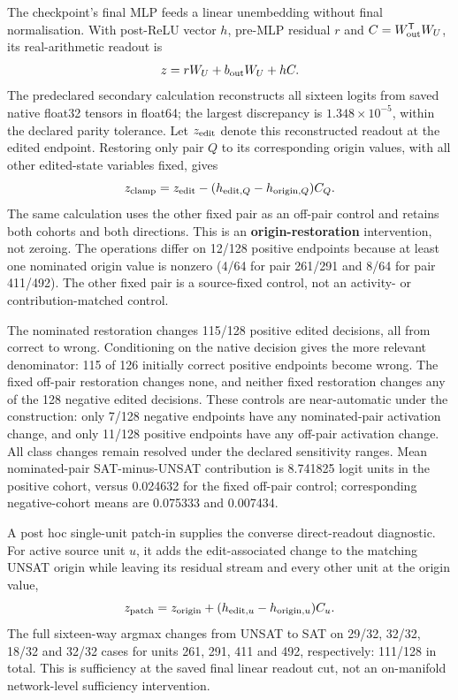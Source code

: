 \documentclass[
  british,
  11pt,
  a4paper,
]{article}
\newcounter{none} %
\begin{document}
The checkpoint's final MLP feeds a linear unembedding without final
normalisation. With post-ReLU vector \(h\), pre-MLP residual \(r\) and
\(C=W_{\rm out}^{\mathsf T}W_U\), its real-arithmetic readout is \[
 z=rW_U+b_{\rm out}W_U+hC.
\] The predeclared secondary calculation reconstructs all sixteen logits
from saved native float32 tensors in float64; the largest discrepancy is
\(1.348\times10^{-5}\), within the declared parity tolerance. Let
\(z_{\rm edit}\) denote this reconstructed readout at the edited
endpoint. Restoring only pair \(Q\) to its corresponding origin values,
with all other edited-state variables fixed, gives \[
 z_{\rm clamp}=z_{\rm edit}-(h_{{\rm edit},Q}-h_{{\rm origin},Q})C_Q.
\] The same calculation uses the other fixed pair as an off-pair control
and retains both cohorts and both directions. This is an
\textbf{origin-restoration} intervention, not zeroing. The operations
differ on 12/128 positive endpoints because at least one nominated
origin value is nonzero (4/64 for pair 261/291 and 8/64 for pair
411/492). The other fixed pair is a source-fixed control, not an
activity- or contribution-matched control.

The nominated restoration changes 115/128 positive edited decisions, all
from correct to wrong. Conditioning on the native decision gives the
more relevant denominator: 115 of 126 initially correct positive
endpoints become wrong. The fixed off-pair restoration changes none, and
neither fixed restoration changes any of the 128 negative edited
decisions. These controls are near-automatic under the construction:
only 7/128 negative endpoints have any nominated-pair activation change,
and only 11/128 positive endpoints have any off-pair activation change.
All class changes remain resolved under the declared sensitivity ranges.
Mean nominated-pair SAT-minus-UNSAT contribution is 8.741825 logit units
in the positive cohort, versus 0.024632 for the fixed off-pair control;
corresponding negative-cohort means are 0.075333 and 0.007434.

A post hoc single-unit patch-in supplies the converse direct-readout
diagnostic. For active source unit \(u\), it adds the edit-associated
change to the matching UNSAT origin while leaving its residual stream
and every other unit at the origin value, \[
z_{\rm patch}=z_{\rm origin}+(h_{{\rm edit},u}-h_{{\rm origin},u})C_u.
\] The full sixteen-way argmax changes from UNSAT to SAT on 29/32,
32/32, 18/32 and 32/32 cases for units 261, 291, 411 and 492,
respectively: 111/128 in total. This is sufficiency at the saved final
linear readout cut, not an on-manifold network-level sufficiency
intervention.
\end{document}
